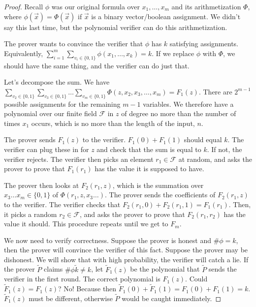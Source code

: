 \begin{proof}
Recall $\phi$ was our original formula over $x_1,\dots, x_m$ and its arithmetization $\Phi$, where $\phi(\vec{x})=\Phi(\vec{x})$ if $\vec{x}$ is a binary vector/boolean assignment.  We didn't say this last time, but the polynomial verifier can do this arithmetization.

The prover wants to convince the verifier that $\phi$ has $k$ satisfying assignments.  Equivalently, $\sum\limits_{i=1}^m\sum\limits_{v_i\in\{0,1\}}\phi(x_1,\dots,x_k)=k$.  If we replace $\phi$ with $\Phi$, we should have the same thing, and the verifier can do just that.

Let's decompose the sum.  We have $\sum\limits_{v_2\in\{0,1\}}\sum\limits_{v_3\in\{0,1\}}\dots \sum\limits_{v_m\in\{0,1\}} \Phi(z,x_2,x_3,\dots,x_m)=F_1(z)$.  There are $2^{m-1}$ possible assignments for the remaining $m-1$ variables.  We therefore have a polynomial over our finite field $\mathcal{F}$ in $z$ of degree no more than the number of times $x_1$ occurs, which is no more than the length of the input, $n$.

The prover sends $F_1(z)$ to the verifier. $F_1(0)+F_1(1)$ should equal $k$.  The verifier can plug these in for $z$ and check that the sum is equal to $k$.  If not, the verifier rejects.  The verifier then picks an element $r_1\in\mathcal{F}$ at random, and asks the prover to prove that $F_1(r_1)$ has the value it is supposed to have.

The prover then looks at $F_2(r_1,z)$, which is the summation over $x_3\dots x_m\in\{0,1\}$ of $\Phi(r_1,z,x_3\dots)$.  The prover sends the coefficients of $F_2(r_1,z)$ to the verifier.  The verifier checks that $F_2(r_1,0)+F_2(r_1,1)=F_1(r_1)$.  Then, it picks a random $r_2\in\mathcal{F}$, and asks the prover to prove that $F_2(r_1,r_2)$ has the value it should.  This procedure repeats until we get to $F_m$.

We now need to verify correctness.  Suppose the prover is honest and $\#\phi=k$, then the prover will convince the verifier of this fact.  Suppose the prover may be dishonest.  We will show that with high probability, the verifier will catch a lie.  If the prover $\tilde{P}$ claims $\#\phi\tilde{k}\neq k$, let  $\tilde{F}_1(z)$ be the polynomial that $\tilde{P}$ sends the verifier in the first round.  The correct polynomial is $F_1(z)$.  Could $\tilde{F}_1(z)=F_1(z)$?  No!  Because then $\tilde{F}_1(0) + \tilde{F}_1(1) = F_1(0)+F_1(1)=k$.  $\tilde{F}_1(z)$ must be different, otherwise $\tilde{P}$ would be caught immediately.


\end{proof}

